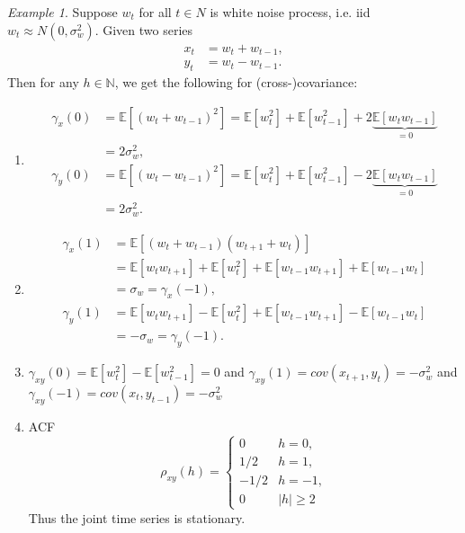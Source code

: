 \documentclass[10pt,titlepage,oneside,openany]{report}
\theoremstyle{remark}
\newtheorem{Example}{Example}[section]
\theoremstyle{plain}
\newcommand{\N}{\mathbb{N}}
\numberwithin{equation}{section}
\renewcommand{\geq}{\geqslant}
\begin{document}
\begin{Example}
	Suppose $w_t$ for all $t\in N$ is white noise process, i.e. iid $w_t \approx N(0, \sigma_w^2)$. Given two series
		\begin{align*}
			x_t &= w_t + w_{t-1},\\
			y_t &= w_t - w_{t-1}.
		\end{align*}
	Then for any $h\in \N$, we get the following for (cross-)covariance:
	\begin{enumerate}
		\item \begin{align*}
					\gamma_x(0) &= \mathds{E}[(w_t + w_{t-1})^2] =  \mathds{E}[w_t^2] + \mathds{E}[w_{t-1}^2] + 2\underbrace{ \mathds{E}[w_t w_{t-1}]}_{=0}\\
					 & = 2\sigma_w^2,
					 \\
					 \gamma_y(0) &= \mathds{E}[(w_t - w_{t-1})^2] =  \mathds{E}[w_t^2] + \mathds{E}[w_{t-1}^2] - 2\underbrace{ \mathds{E}[w_t w_{t-1}]}_{=0}\\
					 & = 2\sigma_w^2.
				\end{align*}
		\item 
			\begin{align*}
				\gamma_x (1) &= \mathds{E}\left[(w_t + w_{t-1}) (w_{t+1} + w_t) \right] \\
						& = \mathds{E}[w_tw_{t+1}] + \mathds{E}[w_t^2] + \mathds{E}[w_{t-1} w_{t+1}] + \mathds{E}[w_{t-1}w_t]\\
						& = \sigma_w = \gamma_x(-1),
						\\
				\gamma_y (1) &=  \mathds{E}[w_tw_{t+1}] - \mathds{E}[w_t^2] + \mathds{E}[w_{t-1} w_{t+1}] - \mathds{E}[w_{t-1}w_t]\\
					&  = - \sigma_w = \gamma_y(-1).
			\end{align*}
		
		\item $\gamma_{xy}(0) =  \mathds{E}[w_t^2]  -  \mathds{E}[w_{t-1}^2]  = 0$ and $\gamma_{xy} (1) = cov (x_{t+1}, y_t) = -\sigma_w^2$ and $\gamma_{xy} (-1) = cov (x_{t}, y_{t-1}) = -\sigma_w^2$
		
		\item ACF
		\begin{equation}
			\rho_{xy} (h) = 
			\begin{cases}
				0 & h=0,\\
				1/2 & h=1,\\
				-1/2 & h=-1,\\
				0 & |h| \geq 2
			\end{cases}
		\end{equation}
	Thus the joint time series is stationary.
	\end{enumerate}
\end{Example}
\end{document}
